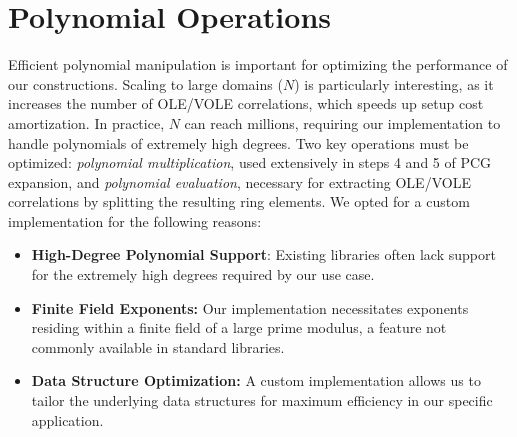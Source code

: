 \section{Polynomial Operations}
\label{sec:polyOperationsImpl}
Efficient polynomial manipulation is important for optimizing the performance of our constructions. Scaling to large domains ($N$) is particularly interesting, as it increases the number of OLE/VOLE correlations, which speeds up setup cost amortization. In practice, $N$ can reach millions, requiring our implementation to handle polynomials of extremely high degrees. Two key operations must be optimized: \textit{polynomial multiplication}, used extensively in steps 4 and 5 of PCG expansion, and \textit{polynomial evaluation}, necessary for extracting OLE/VOLE correlations by splitting the resulting ring elements. We opted for a custom implementation for the following reasons:
\begin{itemize}
\item \textbf{High-Degree Polynomial Support}: Existing libraries often lack support for the extremely high degrees required by our use case.
\item \textbf{Finite Field Exponents:} Our implementation necessitates exponents residing within a finite field of a large prime modulus, a feature not commonly available in standard libraries.
\item \textbf{Data Structure Optimization:} A custom implementation allows us to tailor the underlying data structures for maximum efficiency in our specific application.
\end{itemize}

